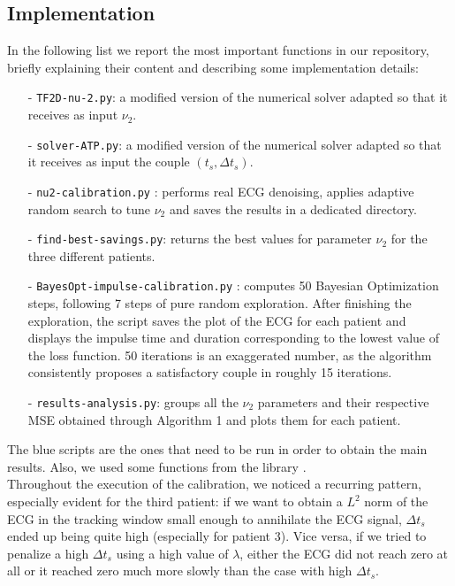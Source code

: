 \documentclass[11pt,a4paper]{article}
\begin{document}
\subsection{Implementation}
In the following list we report the most important functions in our repository, briefly explaining their content and describing some implementation details:
\vspace{1mm}
\begin{itemize}
    \item[-] \texttt{TF2D-nu-2.py}: a modified version of the numerical solver adapted so that it receives as input $\nu_2$.
    \vspace{1mm}
    \item[-] \texttt{solver-ATP.py}: a modified version of the numerical solver adapted so that it receives as input the couple $(t_s, \Delta t_s)$.
    \vspace{1mm}
    \item[-] \color{blue} \texttt{nu2-calibration.py} \color{black}: performs real ECG denoising, applies adaptive random search to tune $\nu_2$ and saves the results in a dedicated directory.
    \vspace{1mm}
    \item[-] \texttt{find-best-savings.py}: returns the best values for parameter $\nu_2$ for the three different patients.
    \vspace{1mm}
    \item[-] \color{blue} \texttt{BayesOpt-impulse-calibration.py} \color{black}: computes 50 Bayesian Optimization steps, following 7 steps of pure random exploration. After finishing the exploration, the script saves the plot of the ECG for each patient and displays the impulse time and duration corresponding to the lowest value of the loss function. 50 iterations is an exaggerated number, as the algorithm consistently proposes a satisfactory couple in roughly 15 iterations.
    \vspace{1mm}
    \item[-] \color{black} \texttt{results-analysis.py}: groups all the $\nu_2$ parameters and their respective MSE obtained through Algorithm 1 and plots them for each patient.
\end{itemize}
\vspace{1mm}
The \color{blue} blue \color{black} scripts are the ones that need to be run in order to obtain the main results. Also, we used some functions from the library \cite{baysopt_git}.\\
Throughout the execution of the calibration, we noticed a recurring pattern, especially evident for the third patient: if we want to obtain a $L^2$ norm of the ECG in the tracking window small enough to annihilate the ECG signal, $\Delta t_s$ ended up being quite high (especially for patient 3). Vice versa, if we tried to penalize a high $\Delta t_s$ using a high value of $\lambda$, either the ECG did not reach zero at all or it reached zero much more slowly than the case with high $\Delta t_s$.
\end{document}
